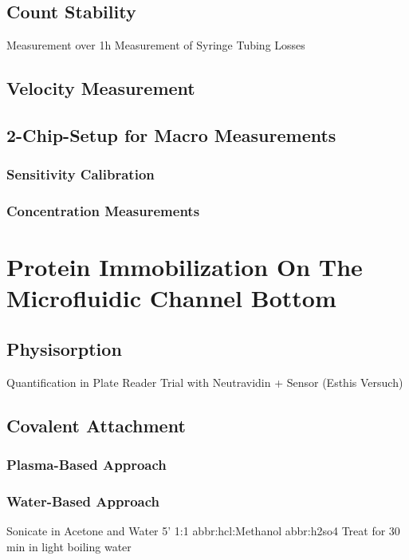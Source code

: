 \subsection{Count Stability}
Measurement over 1h
Measurement of Syringe Tubing Losses

\subsection{Velocity Measurement}

\subsection{2-Chip-Setup for Macro Measurements}

\subsubsection{Sensitivity Calibration}

\subsubsection{Concentration Measurements}

\section{Protein Immobilization On The Microfluidic Channel Bottom}

\subsection{Physisorption}
Quantification in Plate Reader
Trial with Neutravidin + Sensor (Esthis Versuch)

\subsection{Covalent Attachment}

\subsubsection{Plasma-Based Approach}

\subsubsection{Water-Based Approach}
Sonicate in Acetone and Water 5'
1:1 \gls{abbr:hcl}:Methanol
\gls{abbr:h2so4}
Treat for 30 min in light boiling water